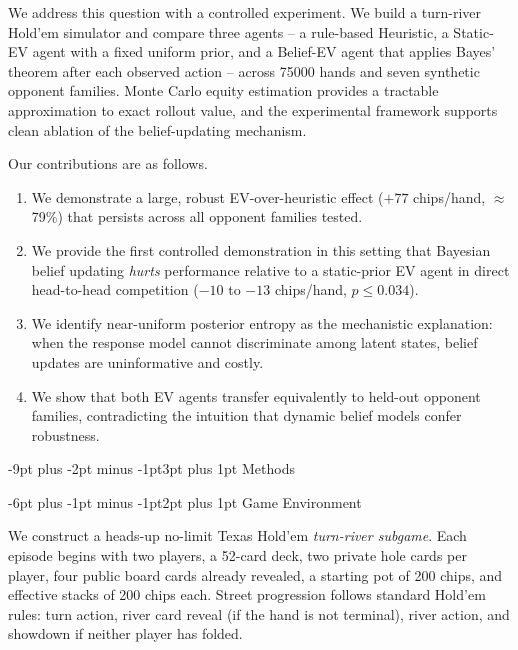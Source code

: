 \documentclass[12pt]{article}
\makeatletter
\renewcommand\section{\@startsection{section}{1}{\z@}%
  {-9pt plus -2pt minus -1pt}{3pt plus 1pt}%
  {\normalfont\large\bfseries}}
\renewcommand\subsection{\@startsection{subsection}{2}{\z@}%
  {-6pt plus -1pt minus -1pt}{2pt plus 1pt}%
  {\normalfont\normalsize\bfseries}}
\makeatother
\begin{document}
We address this question with a controlled experiment.
We build a turn-river Hold'em simulator and compare three
agents -- a rule-based Heuristic, a Static-EV agent with a fixed
uniform prior, and a Belief-EV agent that applies Bayes'
theorem\cite{pearl1988probabilistic} after each observed action --
across \num{75000} hands and seven synthetic opponent families.
Monte Carlo equity estimation\cite{browne2012mcts} provides
a tractable approximation to exact rollout value, and the
experimental framework supports clean ablation of the belief-updating
mechanism.

Our contributions are as follows.
\begin{enumerate}[leftmargin=*, itemsep=1pt, topsep=2pt]
  \item We demonstrate a large, robust EV-over-heuristic effect
    ($+77$ chips/hand, $\approx$79\%) that persists across all
    opponent families tested.
  \item We provide the first controlled demonstration in this
    setting that Bayesian belief updating \emph{hurts} performance
    relative to a static-prior EV agent in direct head-to-head
    competition ($-10$ to $-13$ chips/hand, $p \leq 0.034$).
  \item We identify near-uniform posterior entropy as the mechanistic
    explanation: when the response model cannot discriminate among
    latent states, belief updates are uninformative and costly.
  \item We show that both EV agents transfer equivalently to held-out
    opponent families, contradicting the intuition that dynamic belief
    models confer robustness.
\end{enumerate}

\section{Methods}

\subsection{Game Environment}

We construct a heads-up no-limit Texas Hold'em \textit{turn-river
subgame}\cite{osborne1994course}.
Each episode begins with two players, a 52-card deck, two private
hole cards per player, four public board cards already revealed,
a starting pot of \num{200} chips, and effective stacks of
\num{200} chips each.
Street progression follows standard Hold'em rules: turn action,
river card reveal (if the hand is not terminal), river action, and
showdown if neither player has folded.
\end{document}
